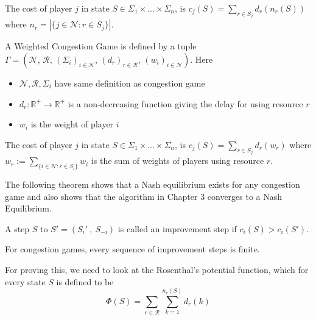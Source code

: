 \noindent
The cost of player $j$ in state $S \in \Sigma_1\times...\times\Sigma_n$,
is $ c_j(S) = \sum_{r\in S_j}d_r(n_r(S))$ where $n_r = |\{j\in\mathcal{N}:r\in S_j\}|$.

\begin{definition}
A Weighted Congestion Game is defined by a tuple $\Gamma = \left(\mathcal{N},\,\mathcal{R},\,(\Sigma_i)_{i\in\mathcal{N}},\, (d_r)_{r\in\mathcal{R}},\, (w_i)_{i\in\mathcal{N}} \right)$. Here
\begin{itemize}
    \item $\mathcal{N},\mathcal{R},\Sigma_i$ have same definition as congestion game
    \item $d_r:\mathbb{R}^+\rightarrow\mathbb{R}^+$ is a non-decreasing function giving the delay for using resource $r$
    \item $w_i$ is the weight of player $i$
\end{itemize}

\noindent
The cost of player $j$ in state $S \in \Sigma_1\times...\times\Sigma_n$,
is $ c_j(S) = \sum_{r\in S_j}d_r(w_r)$ where $w_r := \sum_{\{i\in\mathcal{N} : r \in S_i\}} w_i$ is the sum of weights of players using resource $r$.
\end{definition}


The following theorem shows that a Nash equilibrium exists for any congestion game and also shows that the algorithm in Chapter 3 converges to a Nash Equilibrium.

\begin{definition}
A step $S$ to $S'=(S_i'~,~S_{-i})$ is called an improvement step if $c_i(S)>c_i(S')$.
\end{definition}

\begin{theorem}[Rosenthal 1973]
For congestion games, every sequence of improvement steps is finite.
\end{theorem}

For proving this, we need to look at the Rosenthal's potential function, which for every state $S$ is defined to be
$$\Phi(S) = \sum_{r\in\mathcal{R}}\sum_{k=1}^{n_r(S)}d_r(k)$$

